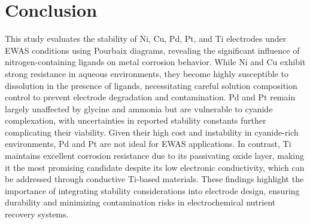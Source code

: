 


\section{Conclusion}
This study evaluates the stability of Ni, Cu, Pd, Pt, and Ti electrodes under EWAS conditions using Pourbaix diagrams, revealing the significant influence of nitrogen-containing ligands on metal corrosion behavior. While Ni and Cu exhibit strong resistance in aqueous environments, they become highly susceptible to dissolution in the presence of  ligands, necessitating careful solution composition control to prevent electrode degradation and contamination. Pd and Pt remain largely unaffected by glycine and ammonia but are vulnerable to cyanide complexation, with uncertainties in reported stability constants further complicating their viability. Given their high cost and instability in cyanide-rich environments, Pd and Pt are not ideal for EWAS applications. In contrast, Ti maintains excellent corrosion resistance due to its passivating oxide layer, making it the most promising candidate despite its low electronic conductivity, which can be addressed through conductive Ti-based materials. These findings highlight the importance of integrating stability considerations into electrode design, ensuring durability and minimizing contamination risks in electrochemical nutrient recovery systems.


